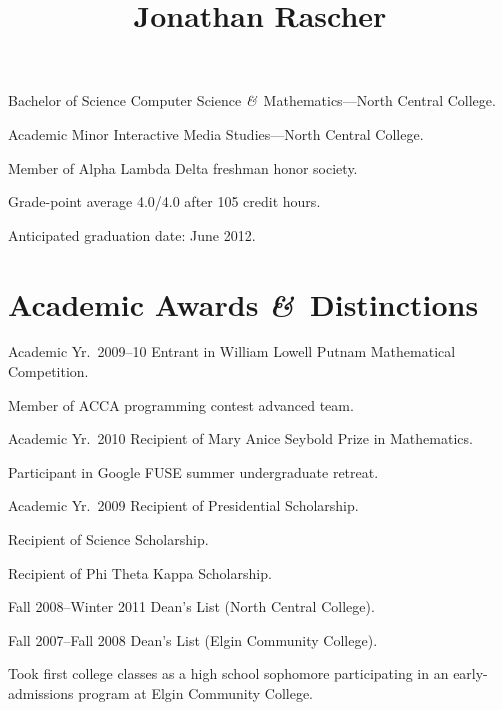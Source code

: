 \documentclass[11pt]{simplecv}
\newcommand*\amp{{\fertigopro\itshape\&}}
\begin{document}


  \title{Jonathan Rascher}
  \maketitle

  \begin{topic}
    \item[Bachelor of Science] Computer Science \amp\ Mathematics---North Central College.

    \item[Academic Minor] Interactive Media Studies---North Central College.

    \item Member of Alpha Lambda Delta freshman honor society.

    \item Grade-point average 4.0/4.0 after 105 credit hours.

    \item Anticipated graduation date: June 2012.
  \end{topic}

  \section{Academic Awards \amp\ Distinctions}
  \begin{topic}
    \item[Academic Yr.\ 2009--10] Entrant in William Lowell Putnam Mathematical Competition.

    Member of ACCA programming contest advanced team.

    \item[Academic Yr.\ 2010] Recipient of Mary Anice Seybold Prize in Mathematics.

    Participant in Google FUSE summer undergraduate retreat.

    \item[Academic Yr.\ 2009] Recipient of Presidential Scholarship.

    Recipient of Science Scholarship.

    Recipient of Phi Theta Kappa Scholarship.

    \item[Fall 2008--Winter 2011] Dean's List (North Central College).

    \item[Fall 2007--Fall 2008] Dean's List (Elgin Community College).

    \item Took first college classes as a high school sophomore participating in an early-admissions program at Elgin Community College.
  \end{topic}
\end{document}

